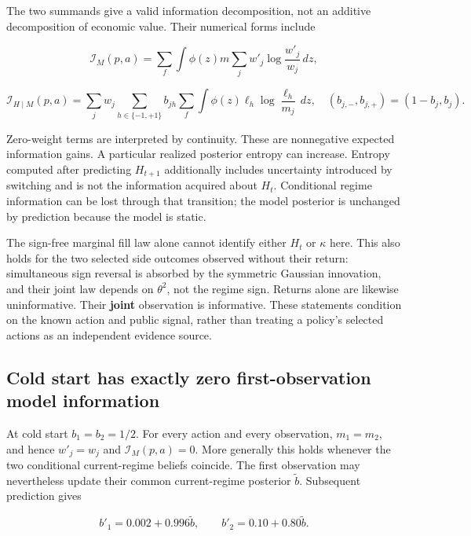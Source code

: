 \documentclass[10pt,a4paper]{article}
\begin{document}
The two summands give a valid information decomposition, not an additive
decomposition of economic value. Their numerical forms include

\begin{equation}
\mathcal I_M(p,a)
=\sum_f\int\phi(z)m
 \sum_jw'_j\log\frac{w'_j}{w_j}\,dz,
\tag{19}
\end{equation}

\begin{equation}
\mathcal I_{H\mid M}(p,a)
=\sum_jw_j\sum_{h\in\{-1,+1\}}b_{jh}
 \sum_f\int\phi(z)\ell_h\log\frac{\ell_h}{m_j}\,dz,
\quad(b_{j,-},b_{j,+})=(1-b_j,b_j).
\tag{20}
\end{equation}

Zero-weight terms are interpreted by continuity. These are nonnegative
expected information gains. A particular realized posterior entropy can
increase. Entropy computed after predicting $H_{t+1}$ additionally includes
uncertainty introduced by switching and is not the information acquired about
$H_t$. Conditional regime information can be lost through that transition;
the model posterior is unchanged by prediction because the model is static.

The sign-free marginal fill law alone cannot identify either $H_t$ or
$\kappa$ here. This also holds for the two selected side outcomes observed
without their return: simultaneous sign reversal is absorbed by the symmetric
Gaussian innovation, and their joint law depends on $\theta^2$, not the
regime sign. Returns alone are likewise uninformative. Their \textbf{joint}
observation is informative. These statements condition on the known action
and public signal, rather than treating a policy's selected actions as an
independent evidence source.

\subsection{Cold start has exactly zero first-observation model information}

At cold start $b_1=b_2=1/2$. For every action and every observation,
$m_1=m_2$, and hence $w'_j=w_j$ and $\mathcal I_M(p,a)=0$.
More generally this holds whenever the two conditional current-regime beliefs
coincide. The first observation may nevertheless update their common
current-regime posterior $\widetilde b$. Subsequent prediction gives

\begin{equation}
b'_1=0.002+0.996\widetilde b,\qquad
b'_2=0.10+0.80\widetilde b.
\tag{21}
\end{equation}
\end{document}
